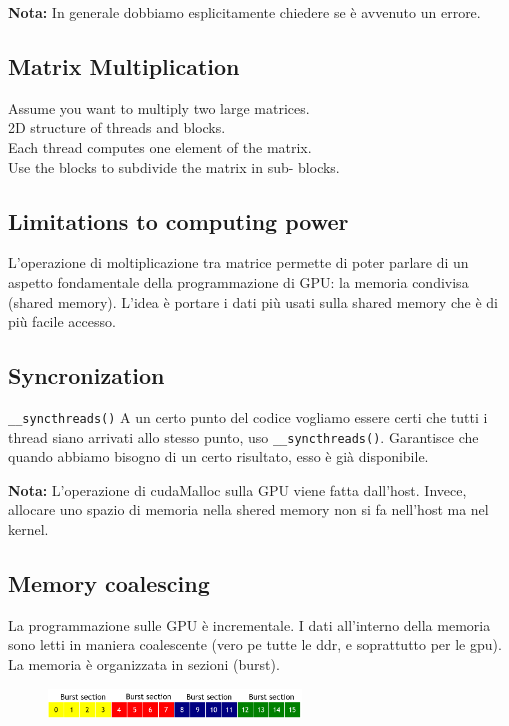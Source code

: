 \noindent
\textbf{Nota:} In generale dobbiamo esplicitamente chiedere se è avvenuto un errore.

\subsection{Matrix Multiplication}
Assume you want to multiply two large matrices.\\
2D structure of threads and blocks.\\
Each thread computes one element of the matrix.\\
Use the blocks to subdivide the matrix in sub-
blocks.\\

\subsection{Limitations to computing power}

L'operazione di moltiplicazione tra matrice permette di poter parlare di un aspetto fondamentale della programmazione di GPU: la memoria condivisa (shared memory). L'idea è portare i dati più usati sulla shared memory che è di più facile accesso.

\subsection{Syncronization}

\texttt{\_\_syncthreads()}
A un certo punto del codice vogliamo essere certi che tutti i thread siano arrivati allo stesso punto, uso \texttt{\_\_syncthreads()}. Garantisce che quando abbiamo bisogno di un certo risultato, esso è già disponibile.

\textbf{Nota:} L'operazione di cudaMalloc sulla GPU viene fatta dall'host. Invece, allocare uno spazio di memoria nella shered memory non si fa nell'host ma nel kernel.


\subsection{Memory coalescing}
La programmazione sulle GPU è incrementale.
I dati all'interno della memoria sono letti in maniera coalescente (vero pe tutte le ddr, e soprattutto per le gpu).\\

La memoria è organizzata in sezioni (burst).

\begin{figure}[ht]
	\centering
	\includegraphics[width=0.6\textwidth]{figure_parallel/memory_coalescing2.png}
\end{figure}

